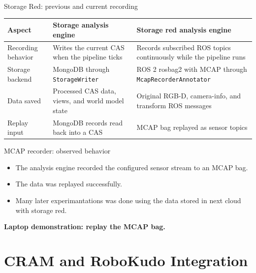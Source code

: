 \documentclass[aspectratio=169,11pt]{beamer}
\begin{document}
\begin{frame}{Storage Red: previous and current recording}
  \centering
  \footnotesize
  \setlength{\tabcolsep}{4pt}
  \renewcommand{\arraystretch}{1.4}
  \begin{tabular}{|>{\raggedright\arraybackslash}p{2.4cm}|>{\raggedright\arraybackslash}p{4.8cm}|>{\raggedright\arraybackslash}p{5.5cm}|}
    \hline
    \textbf{Aspect} & \textbf{Storage analysis engine} & \textbf{Storage red analysis engine} \\
    \hline
    Recording behavior & Writes the current CAS when the pipeline ticks & Records subscribed ROS topics continuously while the pipeline runs \\
    \hline
    Storage backend & MongoDB through \texttt{StorageWriter} & ROS 2 rosbag2 with MCAP through \texttt{McapRecorderAnnotator} \\
    \hline
    Data saved & Processed CAS data, views, and world model state & Original RGB-D, camera-info, and transform ROS messages \\
    \hline
    Replay input & MongoDB records read back into a CAS & MCAP bag replayed as sensor topics \\
    \hline
  \end{tabular}
\end{frame}

\begin{frame}{MCAP recorder: observed behavior}
  \begin{itemize}
    \setlength{\itemsep}{0.55cm}
    \item The analysis engine recorded the configured sensor stream to an MCAP bag.
    \item The data was replayed successfully.
    \item Many later experimantations was done using the data stored in next cloud with storage red.
  \end{itemize}

  \bigskip
  \centering
  \textcolor{uniblue}{\textbf{Laptop demonstration: replay the MCAP bag.}}
\end{frame}

\section{CRAM and RoboKudo Integration}
\end{document}
